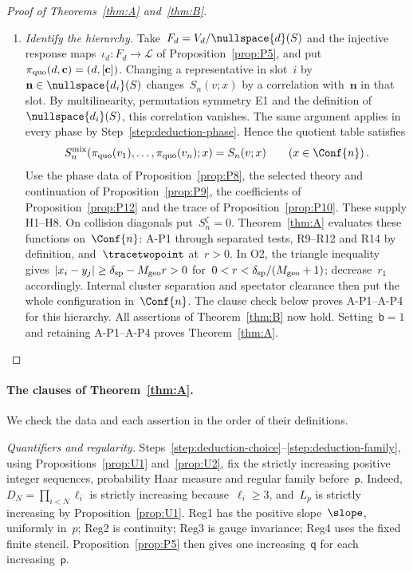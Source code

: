 \begin{proof}[Proof of Theorems~\ref{thm:A} and~\ref{thm:B}]
\begin{enumerate}[label=\emph{Step \arabic*:},ref=\arabic*,leftmargin=4.5em,itemsep=0.4em,beginpenalty=10000]
\item\label{step:deduction-hierarchy} \emph{Identify the hierarchy.} Take~$F_d=V_d/\nullspace{d}(S)$ and the injective response maps~$\iota_d:F_d\to\mathcal L$ of Proposition~\ref{prop:P5}, and put~$\pi_{\rm quo}(d,\mathbf c)=(d,[\mathbf c])$. Changing a representative in slot~$i$ by~$\mathbf n\in\nullspace{d_i}(S)$ changes~$S_n(v;x)$ by a correlation with~$\mathbf n$ in that slot. By multilinearity, permutation symmetry E1 and the definition of~$\nullspace{d_i}(S)$, this correlation vanishes. The same argument applies in every phase by Step~\ref{step:deduction-phase}. Hence the quotient table satisfies
\begin{equation}\label{eq:deduction-quotient}
S_n^{\rm mix}(\pi_{\rm quo}(v_1),\ldots,\pi_{\rm quo}(v_n);x)=S_n(v;x)\qquad(x\in\Conf{n})\,.
\end{equation}
Use the phase data of Proposition~\ref{prop:P8}, the selected theory and continuation of Proposition~\ref{prop:P9}, the coefficients of Proposition~\ref{prop:P12} and the trace of Proposition~\ref{prop:P10}. These supply H1--H8. On collision diagonals put~$S_n^\zeta=0$. Theorem~\ref{thm:A} evaluates these functions on~$\Conf{n}$: A-P1 through separated tests, R9--R12 and R14 by definition, and~$\tracetwopoint$ at~$r>0$. In O2, the triangle inequality gives~$|x_i-y_j|\ge\delta_{\rm sp}-M_{\rm geo}r>0$ for~$0<r<\delta_{\rm sp}/(M_{\rm geo}+1)$; decrease~$r_1$ accordingly. Internal cluster separation and spectator clearance then put the whole configuration in~$\Conf{n}$. The clause check below proves A-P1--A-P4 for this hierarchy. All assertions of Theorem~\ref{thm:B} now hold. Setting~$\mathsf b=1$ and retaining A-P1--A-P4 proves Theorem~\ref{thm:A}.\qedhere
\end{enumerate}
\end{proof}

\begin{samepage}
\paragraph{The clauses of Theorem~\ref{thm:A}.}
We check the data and each assertion in the order of their definitions.

\emph{Quantifiers and regularity.} Steps~\ref{step:deduction-choice}--\ref{step:deduction-family}, using Propositions~\ref{prop:U1} and~\ref{prop:U2}, fix the strictly increasing positive integer sequences, probability Haar measure and regular family before~$\mathsf p$. Indeed, $D_N=\prod_{i<N}\ell_i$ is strictly increasing because~$\ell_i\ge3$, and~$L_p$ is strictly increasing by Proposition~\ref{prop:U1}. Reg1 has the positive slope~$\slope$, uniformly in~$p$; Reg2 is continuity; Reg3 is gauge invariance; Reg4 uses the fixed finite stencil. Proposition~\ref{prop:P5} then gives one increasing~$\mathsf q$ for each increasing~$\mathsf p$.

\end{samepage}

